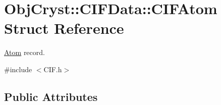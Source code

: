 \hypertarget{struct_obj_cryst_1_1_c_i_f_data_1_1_c_i_f_atom}{}\section{Obj\+Cryst\+::C\+I\+F\+Data\+::C\+I\+F\+Atom Struct Reference}
\label{struct_obj_cryst_1_1_c_i_f_data_1_1_c_i_f_atom}


\mbox{\hyperlink{class_obj_cryst_1_1_atom}{Atom}} record.  




{\ttfamily \#include $<$C\+I\+F.\+h$>$}

\subsection*{Public Attributes}
